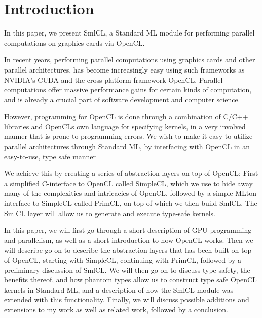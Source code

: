 \section{Introduction}

In this paper, we present SmlCL, a Standard ML module for performing
parallel computations on graphics cards via OpenCL.

In recent years, performing parallel computations using graphics cards
and other parallel architectures, has become increasingly easy using
such frameworks as NVIDIA's CUDA and the cross-platform framework
OpenCL. Parallel computations offer massive performance gains for
certain kinds of computation, and is already a crucial part of
software development and computer science.

However, programming for OpenCL is done through a combination of C/C++
libraries and OpenCLs own language for specifying kernels, in a very
involved manner that is prone to programming errors. We wish to make
it easy to utilize parallel architectures through Standard ML, by
interfacing with OpenCL in an easy-to-use, type safe manner

We achieve this by creating a series of abstraction layers on top of
OpenCL: First a simplified C-interface to OpenCL called SimpleCL,
which we use to hide away many of the complexities and intricacies of
OpenCL, followed by a simple MLton interface to SimpleCL called
PrimCL, on top of which we then build SmlCL. The SmlCL layer will
allow us to generate and execute type-safe kernels.

In this paper, we will first go through a short description of GPU
programming and parallelism, as well as a short introduction to how
OpenCL works. Then we will describe go on to describe the abstraction
layers that has been built on top of OpenCL, starting with SimpleCL,
continuing with PrimCL, followed by a preliminary discussion of
SmlCL. We will then go on to discuss type safety, the benefits thereof,
and how phantom types allow us to construct type safe OpenCL kernels
in Standard ML, and a description of how the SmlCL module was extended
with this functionality. Finally, we will discuss possible additions and
extensions to my work as well as related work, followed by a
conclusion.
